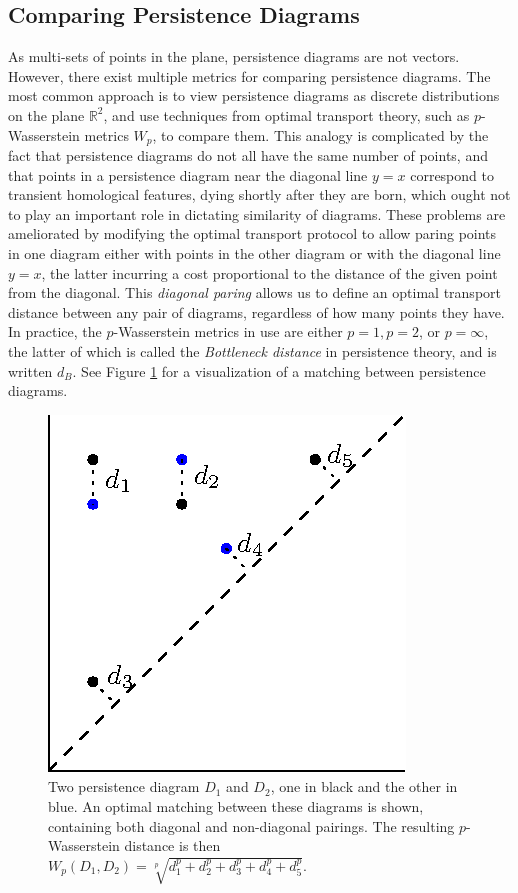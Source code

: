 \documentclass[conference]{IEEEtran}
\theoremstyle{definition}
\numberwithin{figure}{section}
\begin{document}
\subsection{Comparing Persistence Diagrams}

As multi-sets of points in the plane, persistence diagrams are not vectors. However, there exist multiple metrics for comparing persistence diagrams. The most common approach is to view persistence diagrams as discrete distributions on the plane $\mathbb{R}^2$, and use techniques from optimal transport theory, such as $p$-Wasserstein metrics $W_p$, to compare them. This analogy is complicated by the fact that persistence diagrams do not all have the same number of points, and that points in a persistence diagram near the diagonal line $y=x$ correspond to transient homological features, dying shortly after they are born, which ought not to play an important role in dictating similarity of diagrams. These problems are ameliorated by modifying the optimal transport protocol to allow paring points in one diagram either with points in the other diagram or with the diagonal line $y=x$, the latter incurring a cost proportional to the distance of the given point from the diagonal. This \emph{diagonal paring} allows us to define an optimal transport distance between any pair of diagrams, regardless of how many points they have. In practice, the $p$-Wasserstein metrics in use are either $p=1,p=2$, or $p=\infty$, the latter of which is called the \emph{Bottleneck distance} in persistence theory, and is written $d_B$. See Figure \ref{fig:wasserstein} for a visualization of a matching between persistence diagrams.  

\begin{figure}
	\centering
	\includegraphics[scale=1]{wasserstein.eps}
	\caption{Two persistence diagram $D_1$ and $D_2$, one in black and the other in blue. An optimal matching between these diagrams is shown, containing both diagonal and non-diagonal pairings. The resulting $p$-Wasserstein distance is then $W_{p}(D_1,D_2) = \sqrt[p]{d_1^p + d_2^p + d_3^p + d_4^p + d_5^p}$.}
	\label{fig:wasserstein}
\end{figure}
\end{document}
